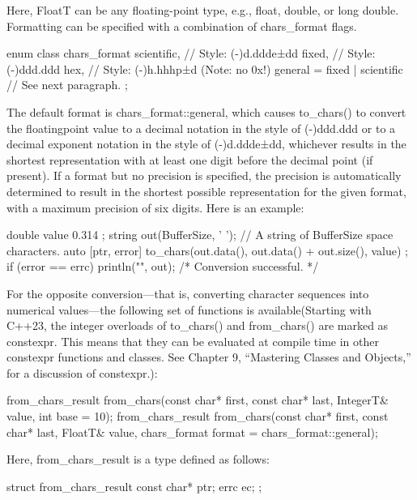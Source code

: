 Here, FloatT can be any floating-point type, e.g., float, double, or long double. Formatting can be specified with a combination of chars\_format flags.

\begin{cpp}
enum class chars_format {
    scientific, // Style: (-)d.ddde±dd
    fixed, // Style: (-)ddd.ddd
    hex, // Style: (-)h.hhhp±d (Note: no 0x!)
    general = fixed | scientific // See next paragraph.
};
\end{cpp}

The default format is chars\_format::general, which causes to\_chars() to convert the floatingpoint value to a decimal notation in the style of (-)ddd.ddd or to a decimal exponent notation in the style of (-)d.ddde±dd, whichever results in the shortest representation with at least one digit before the decimal point (if present). If a format but no precision is specified, the precision is automatically determined to result in the shortest possible representation for the given format, with a maximum precision of six digits. Here is an example:

\begin{cpp}
double value { 0.314 };
string out(BufferSize, ' '); // A string of BufferSize space characters.
auto [ptr, error] { to_chars(out.data(), out.data() + out.size(), value) };
if (error == errc{}) { println("{}", out); /* Conversion successful. */ }
\end{cpp}


For the opposite conversion—that is, converting character sequences into numerical values—the following set of functions is available(Starting with C++23, the integer overloads of to\_chars() and from\_chars() are marked as constexpr. This means that they can be evaluated at compile time in other constexpr functions and classes. See Chapter 9, “Mastering Classes and Objects,” for a discussion of constexpr.):

\begin{cpp}
from_chars_result from_chars(const char* first, const char* last, IntegerT& value,
                             int base = 10);
from_chars_result from_chars(const char* first, const char* last, FloatT& value,
                             chars_format format = chars_format::general);
\end{cpp}

Here, from\_chars\_result is a type defined as follows:

\begin{cpp}
struct from_chars_result {
    const char* ptr;
    errc ec;
};
\end{cpp}

